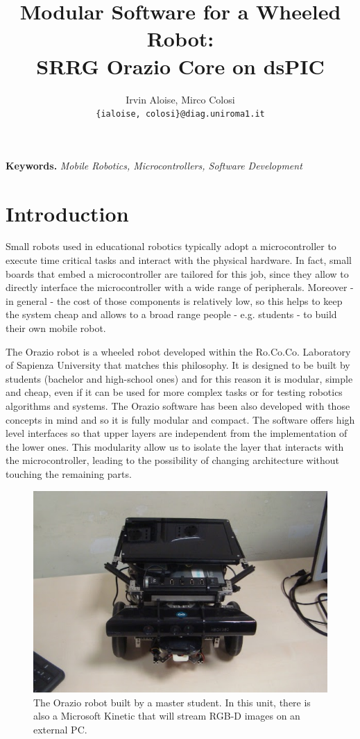 \documentclass[10pt,a4paper, notitlepage]{report}
\title{Modular Software for a Wheeled Robot:\\SRRG Orazio Core on dsPIC}
\author{Irvin Aloise, Mirco Colosi\\ \tt\small \{ialoise, colosi\}@diag.uniroma1.it}
\begin{document}
\maketitle


\textbf{Keywords.} \textit{Mobile Robotics, Microcontrollers, Software Development}

\section*{Introduction} \label{sec:intro}
\lettrine{S}{}mall robots used in educational robotics typically adopt a microcontroller to execute time critical tasks and interact with the physical hardware. In fact, small boards that embed a microcontroller are tailored for this job, since they allow to directly interface the microcontroller with a wide range of peripherals. Moreover - in general - the cost of those components is relatively low, so this helps to keep the system cheap and allows to a broad range people - e.g. students - to build their own mobile robot.

The Orazio robot is a wheeled robot developed within the Ro.Co.Co. Laboratory of Sapienza University that matches this philosophy. It is designed to be built by students (bachelor and high-school ones) and for this reason it is modular, simple and cheap, even if it can be used for more complex tasks or for testing robotics algorithms and systems. The Orazio software has been also developed with those concepts in mind and so it is fully modular and compact. The software offers high level interfaces so that upper layers are independent from the implementation of the lower ones. This modularity allow us to isolate the layer that interacts with the microcontroller, leading to the possibility of changing architecture without touching the remaining parts.

\begin{figure}[!h]
  \centering
  \includegraphics[width=0.75\linewidth]{pics/orazio}
  \caption{The Orazio robot built by a master student. In this unit, there is also a Microsoft Kinetic that will stream RGB-D images on an external PC.}
  \label{fig:orazio}
\end{figure}
\end{document}
